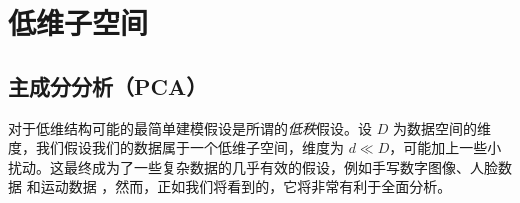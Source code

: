 \documentclass[../../book-main_zh.tex]{subfiles}
\begin{document}






\section{低维子空间} \label{sec:lowrank}

\subsection{主成分分析（PCA）} \label{sub:pca}

对于低维结构可能的最简单建模假设是所谓的\textit{低秩}假设。设 \(D\) 为数据空间的维度，我们假设我们的数据属于一个低维子空间，维度为 \(d \ll D\)，可能加上一些小扰动。这最终成为了一些复杂数据的几乎有效的假设，例如手写数字图像、人脸数据 \cite{BasriR2003-PAMI} 和运动数据 \cite{Vidal-GPCA}，然而，正如我们将看到的，它将非常有利于全面分析。
\end{document}
